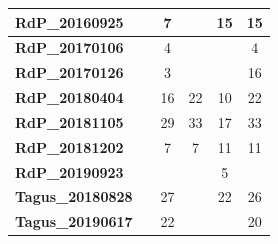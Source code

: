 \begin{table}
\begin{tabular}{|l|c|c|c|c|c|}
    {\color[HTML]{3166FF} \textbf{RdP\_20160925}}     &                          & 7                        &                          & 15                       & 15                       \\ \hline
    {\color[HTML]{3166FF} \textbf{RdP\_20170106}}     &                          & 4                        &                          &                          & 4                        \\ \hline
    {\color[HTML]{3166FF} \textbf{RdP\_20170126}}     &                          & 3                        &                          &                          & 16                       \\ \hline
    {\color[HTML]{3166FF} \textbf{RdP\_20180404}}     &                          & 16                       & 22                       & 10                       & 22                       \\ \hline
    {\color[HTML]{3166FF} \textbf{RdP\_20181105}}     &                          & 29                       & 33                       & 17                       & 33                       \\ \hline
    {\color[HTML]{3166FF} \textbf{RdP\_20181202}}     &                          & 7                        & 7                        & 11                       & 11                       \\ \hline
    {\color[HTML]{3166FF} \textbf{RdP\_20190923}}     &                          &                          &                          & 5                        &                          \\ \hline
    {\color[HTML]{FFC702} \textbf{Tagus\_20180828}}   &                          & 27                       &                          & 22                       & 26                       \\ \hline
    {\color[HTML]{FFC702} \textbf{Tagus\_20190617}}   &                          & 22                       &                          &                          & 20                       \\ \hline
    \end{tabular}
    \label{dat:tab:inventario}
    \end{table}
    
